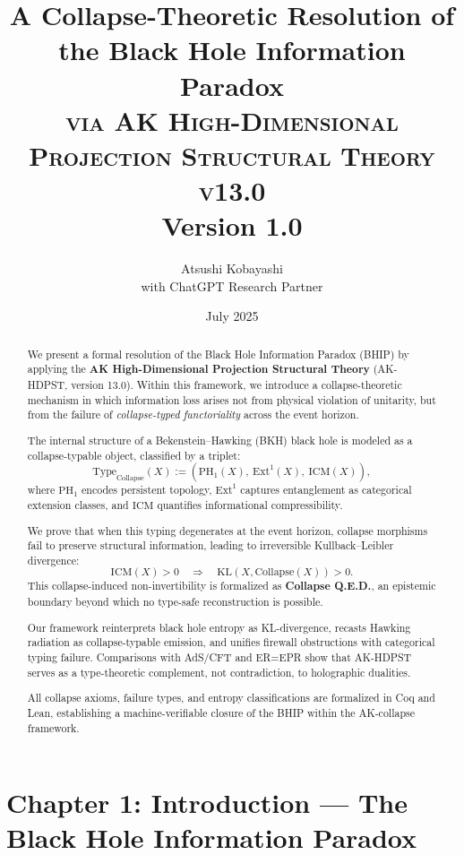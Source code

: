 \documentclass[11pt]{article}
\title{\textbf{A Collapse-Theoretic Resolution of the Black Hole Information Paradox} \\[1ex]
\Large \textsc{via AK High-Dimensional Projection Structural Theory v13.0} \\[1ex]
\small Version 1.0}
\author{Atsushi Kobayashi \\ \small with ChatGPT Research Partner}
\date{July 2025}
\begin{document}
\maketitle



\begin{abstract}
We present a formal resolution of the Black Hole Information Paradox (BHIP) by applying the \textbf{AK High-Dimensional Projection Structural Theory} (AK-HDPST, version 13.0). Within this framework, we introduce a collapse-theoretic mechanism in which information loss arises not from physical violation of unitarity, but from the failure of \emph{collapse-typed functoriality} across the event horizon.

The internal structure of a Bekenstein–Hawking (BKH) black hole is modeled as a collapse-typable object, classified by a triplet:
\[
\mathrm{Type}_{\mathrm{Collapse}}(X) := (\mathrm{PH}_1(X),\ \mathrm{Ext}^1(X),\ \mathrm{ICM}(X)),
\]
where \( \mathrm{PH}_1 \) encodes persistent topology, \( \mathrm{Ext}^1 \) captures entanglement as categorical extension classes, and \( \mathrm{ICM} \) quantifies informational compressibility.

We prove that when this typing degenerates at the event horizon, collapse morphisms fail to preserve structural information, leading to irreversible Kullback–Leibler divergence:
\[
\mathrm{ICM}(X) > 0 \quad \Rightarrow \quad \mathrm{KL}(X, \mathrm{Collapse}(X)) > 0.
\]
This collapse-induced non-invertibility is formalized as \textbf{Collapse Q.E.D.}, an epistemic boundary beyond which no type-safe reconstruction is possible.

Our framework reinterprets black hole entropy as KL-divergence, recasts Hawking radiation as collapse-typable emission, and unifies firewall obstructions with categorical typing failure. Comparisons with AdS/CFT and ER=EPR show that AK-HDPST serves as a type-theoretic complement, not contradiction, to holographic dualities.

All collapse axioms, failure types, and entropy classifications are formalized in Coq and Lean, establishing a machine-verifiable closure of the BHIP within the AK-collapse framework.
\end{abstract}



\section{Chapter 1: Introduction — The Black Hole Information Paradox}
\end{document}
